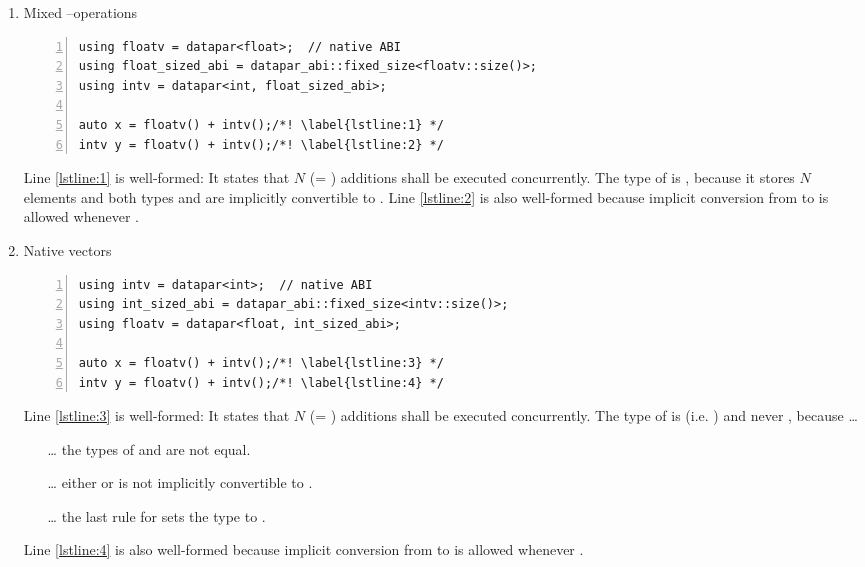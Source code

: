 \begin{enumerate}
  \item Mixed \intt--\float operations
\smallskip\begin{lstlisting}[style=Vc,numbers=left]
using floatv = datapar<float>;  // native ABI
using float_sized_abi = datapar_abi::fixed_size<floatv::size()>;
using intv = datapar<int, float_sized_abi>;

auto x = floatv() + intv();/*! \label{lstline:1} */
intv y = floatv() + intv();/*! \label{lstline:2} */
\end{lstlisting}
    Line \ref{lstline:1} is well-formed:
    It states that $N$ (= ) additions shall be executed concurrently.
    The type of  is \datapar[<\float{}>], because it stores $N$ elements and both types  and  are implicitly convertible to \datapar[<\float{}>].
    Line \ref{lstline:2} is also well-formed because implicit conversion from  to  is allowed whenever .

  \item Native \intt vectors
\smallskip\begin{lstlisting}[style=Vc,numbers=left]
using intv = datapar<int>;  // native ABI
using int_sized_abi = datapar_abi::fixed_size<intv::size()>;
using floatv = datapar<float, int_sized_abi>;

auto x = floatv() + intv();/*! \label{lstline:3} */
intv y = floatv() + intv();/*! \label{lstline:4} */
\end{lstlisting}
    Line \ref{lstline:3} is well-formed:
    It states that $N$ (= ) additions shall be executed concurrently.
    The type of  is  (i.e. ) and never \datapar[<\float{}>], because \ldots
    \begin{enumerate}
      \item[\ldots] the  types of  and  are not equal.
      \item[\ldots] either  or  is not implicitly convertible to \datapar[<\float{}>].
      \item[\ldots] the last rule for  sets the  type to .
    \end{enumerate}
    Line \ref{lstline:4} is also well-formed because implicit conversion from  to  is allowed whenever .
\end{enumerate}


